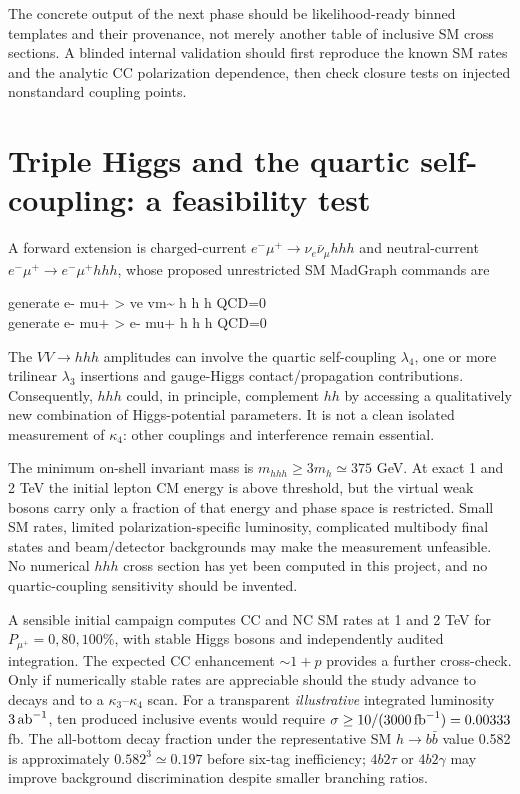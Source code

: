 \documentclass[12pt,a4paper]{article}
\newcommand{\newnote}{\clearpage}
\begin{document}
The concrete output of the next phase should be likelihood-ready binned templates and their provenance, not merely another table of inclusive SM cross sections. A blinded internal validation should first reproduce the known SM rates and the analytic CC polarization dependence, then check closure tests on injected nonstandard coupling points.




\newnote

\section{Triple Higgs and the quartic self-coupling: a feasibility test}
A forward extension is charged-current $e^-\mu^+\to\nu_e\bar\nu_\mu hhh$ and neutral-current $e^-\mu^+\to e^-\mu^+hhh$, whose proposed unrestricted SM MadGraph commands are
\begin{center}\ttfamily\small
 generate e- mu+ > ve vm\textasciitilde{} h h h QCD=0\\
 generate e- mu+ > e- mu+ h h h QCD=0
\end{center}
The $VV\to hhh$ amplitudes can involve the quartic self-coupling $\lambda_4$, one or more trilinear $\lambda_3$ insertions and gauge-Higgs contact/propagation contributions. Consequently, $hhh$ could, in principle, complement $hh$ by accessing a qualitatively new combination of Higgs-potential parameters. It is not a clean isolated measurement of $\kappa_4$: other couplings and interference remain essential.

The minimum on-shell invariant mass is $m_{hhh}\ge3m_h\simeq375$ GeV. At exact 1 and 2 TeV the initial lepton CM energy is above threshold, but the virtual weak bosons carry only a fraction of that energy and phase space is restricted. Small SM rates, limited polarization-specific luminosity, complicated multibody final states and beam/detector backgrounds may make the measurement unfeasible. No numerical $hhh$ cross section has yet been computed in this project, and no quartic-coupling sensitivity should be invented.

A sensible initial campaign computes CC and NC SM rates at 1 and 2 TeV for $P_{\mu^+}=0,80,100\%$, with stable Higgs bosons and independently audited integration. The expected CC enhancement $\sim1+p$ provides a further cross-check. Only if numerically stable rates are appreciable should the study advance to decays and to a $\kappa_3$--$\kappa_4$ scan. For a transparent \emph{illustrative} integrated luminosity $3\,{\rm ab}^{-1}$, ten produced inclusive events would require $\sigma\ge10/(3000\,{\rm fb}^{-1})=0.00333$ fb. The all-bottom decay fraction under the representative SM $h\to b\bar b$ value 0.582 is approximately $0.582^3\simeq0.197$ before six-tag inefficiency; $4b2\tau$ or $4b2\gamma$ may improve background discrimination despite smaller branching ratios.
\end{document}
